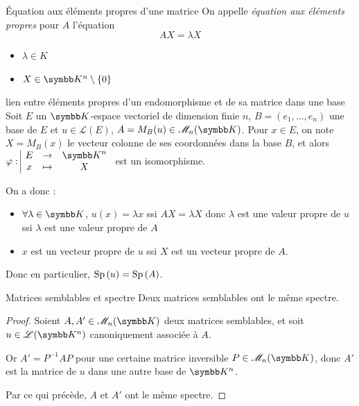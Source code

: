 \begin{definition}{Équation aux éléments propres d'une matrice}{}
    On appelle \emph{équation aux éléments propres} pour $A$ l'équation 
    $$AX = \lambda X$$

    \begin{itemize}
        \item $\lambda \in K$
        \item $X \in \K^n \setminus \{0\}$
    \end{itemize}
    
\end{definition}

\begin{propositionnt}{lien entre éléments propres d'un endomorphisme et de sa matrice dans une base}{}
    Soit $E$ un $\K$-espace vectoriel de dimension finie $n$, 
    $B = (e_1, \ldots, e_n)$ une base de $E$ et $u \in \mathscr L(E)$, 
    $A = M_B(u) \in \mathscr M_n(\K)$. 
    Pour $x \in E$, on note $X = M_B(x)$ le vecteur colonne de ses coordonnées dans la base $B$, et alors 
    $\fonction{\varphi}{E}{\K^n}{x}{X}$ est un isomorphisme. 
    
    On a donc : 
    \begin{itemize}
        \item $\forall \lambda \in \K$, $u(x) = \lambda x$ ssi $AX = \lambda X$ donc $\lambda$ est une valeur propre de $u$
        ssi $\lambda$ est une valeur propre de $A$
        \item $x$ est un vecteur propre de $u$
        ssi $X$ est un vecteur propre de $A$.
    \end{itemize}
    Donc en particulier, $\operatorname{Sp} \,(u) = \operatorname{Sp} \,(A)$.
\end{propositionnt}


\begin{proposition}{Matrices semblables et spectre}{}
    Deux matrices semblables ont le même spectre.
\end{proposition}


\begin{proof}
    Soient $A, A' \in \mathscr M_n(\K)$ deux matrices semblables, et 
    soit $u \in \mathscr L(\K^n)$ canoniquement associée à $A$. 

    Or $A' = P^{-1} A P$ pour une certaine matrice inversible $P \in \mathscr M_n(\K)$, 
    donc $A'$ est la matrice de $u$ dans une autre base de $\K^n$.

    Par ce qui précède, $A$ et $A'$ ont le même spectre.
\end{proof}

